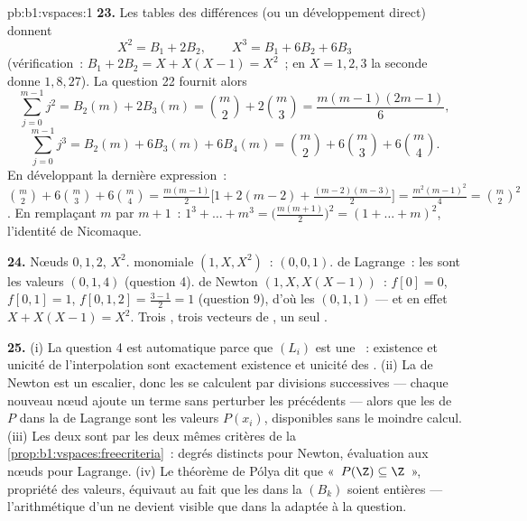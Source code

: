 \begin{solution}{pb:b1:vspaces:1}
\textbf{23.} Les tables des différences (ou un développement direct)
donnent
\[
X^2 = B_1 + 2 B_2, \qquad X^3 = B_1 + 6 B_2 + 6 B_3
\]
(vérification~: $B_1 + 2B_2 = X + X(X-1) = X^2$~; en $X = 1, 2, 3$ la
seconde donne $1, 8, 27$). La question 22 fournit alors
\[
\sum_{j=0}^{m-1} j^2 = B_2(m) + 2B_3(m)
= \binom m2 + 2\binom m3 = \frac{m(m-1)(2m-1)}{6},
\]
\[
\sum_{j=0}^{m-1} j^3 = B_2(m) + 6B_3(m) + 6B_4(m)
= \binom m2 + 6\binom m3 + 6\binom m4 .
\]
En développant la dernière expression~: $\binom m2 + 6\binom m3 +
6\binom m4 = \frac{m(m-1)}{2}\bigl[1 + 2(m-2) +
\frac{(m-2)(m-3)}{2}\bigr] = \frac{m^2(m-1)^2}{4} = \binom m2^2$.
En remplaçant $m$ par $m + 1$~: $1^3 + \dots + m^3 =
\bigl(\frac{m(m+1)}2\bigr)^2 = (1 + \dots + m)^2$, l'identité de
Nicomaque.

\textbf{24.} Nœuds $0, 1, 2$,  $X^2$.  monomiale
$(1, X, X^2)$~:  $(0, 0, 1)$.  de Lagrange~: les
 sont les valeurs $(0, 1, 4)$ (question 4).  de Newton
$(1, X, X(X-1))$~:  $f[0] = 0$, $f[0,1] = 1$,
$f[0,1,2] = \frac{3 - 1}{2} = 1$ (question 9), d'où les 
$(0, 1, 1)$ --- et en effet $X + X(X-1) = X^2$. Trois , trois
vecteurs de , un seul .

\textbf{25.} (i) La question 4 est automatique parce que $(L_i)$ est
une \emph{}~: existence et unicité de l'interpolation sont
exactement existence et unicité des . (ii) La  de
Newton est un escalier, donc les  se calculent par
divisions successives --- chaque nouveau nœud ajoute un terme sans
perturber les précédents --- alors que les  de $P$ dans la
 de Lagrange sont les valeurs $P(x_i)$, disponibles sans le moindre
calcul. (iii) Les deux  sont  par les deux mêmes critères de
la \cref{prop:b1:vspaces:freecriteria}~: degrés distincts pour Newton,
évaluation aux nœuds pour Lagrange. (iv) Le théorème de Pólya dit que
«~$P(\Z) \subseteq \Z$~», propriété des valeurs, équivaut au fait que
les  dans la  $(B_k)$ soient entières --- l'arithmétique
d'un  ne devient visible que dans la  adaptée à la
question.
\end{solution}

